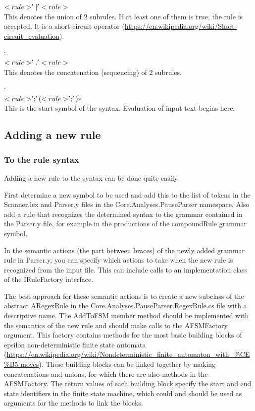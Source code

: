 \documentclass[a4paper,11pt]{report}
\begin{document}
\begin{description}
				$ <rule> '|' <rule> $\\
				This denotes the union of 2 subrules. If at least one of them is true, the rule is accepted. It is a short-circuit operator (\url{https://en.wikipedia.org/wiki/Short-circuit_evaluation}). 
			\item[Concatenation]:\\ $ <rule> '.' <rule> $\\	
				This denotes the concatenation (sequencing) of 2 subrules.		
			\item[Start]:\\ $ <rule>';' (<rule>';')*$\\	
				This is the start symbol of the syntax. Evaluation of input text begins here.
		\end{description}	
	 
	\subsection{Adding a new rule}
		\subsubsection{To the rule syntax}\label{pauselocmarkeraddruletosyntax}
			Adding a new rule to the syntax can be done quite easily.
		
			First determine a new symbol to be used and add this to the list of tokens in the Scanner.lex and Parser.y files in the Core.Analyses.PauseParser namespace. Also add a rule that recognizes the determined syntax to the grammar contained in the Parser.y file, for example in the productions of the compoundRule grammar symbol.
		
			In the semantic actions (the part between braces) of the newly added grammar rule in Parser.y, you can specify which actions to take when the new rule is recognized from the input file.
			This can include calls to an implementation class of the IRuleFactory interface.
		
			The best approach for these semantic actions is to create a new subclass of the abstract ARegexRule in the Core.Analyses.PauseParser.RegexRule.cs file with a descriptive name. The AddToFSM member method should be implemented with the semantics of the new rule and should make calls to the AFSMFactory argument. This factory contains methods for the most basic building blocks of epsilon non-deterministic finite state automata (\url{https://en.wikipedia.org/wiki/Nondeterministic_finite_automaton_with_\%CE\%B5-moves}). These building blocks can be linked together by making concatenations and unions, for which there are also methods in the AFSMFactory. The return values of each building block specify the start and end state identifiers in the finite state machine, which could and should be used as arguments for the methods to link the blocks.
		
\end{document}
